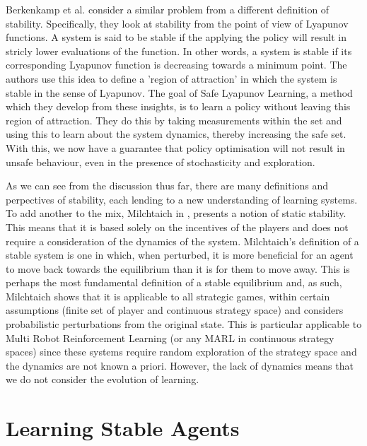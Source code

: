\documentclass[preprint,11pt]{report}
\begin{document}
Berkenkamp et al. \cite{Berkenkamp2017SafeGuarantees} consider a similar problem from a different
definition of stability. Specifically, they look at stability from the point of view of Lyapunov
functions. A system is said to be stable if the applying the policy will result in stricly lower
evaluations of the function. In other words, a system is stable if its corresponding Lyapunov
function is decreasing towards a minimum point. The authors use this idea to define a 'region of
attraction' in which the system is stable in the sense of Lyapunov. The goal of Safe Lyapunov
Learning, a method which they develop from these insights, is to learn a policy without leaving this
region of attraction. They do this by taking measurements within the set and using this to learn
about the system dynamics, thereby increasing the safe set. With this, we now have a guarantee that
policy optimisation will not result in unsafe behaviour, even in the presence of stochasticity and
exploration.

As we can see from the discussion thus far, there are many definitions and perpectives of stability,
each lending to a new understanding of learning systems. To add another to the mix, Milchtaich in
\cite{Milchtaich2007StaticGames}, presents a notion of static stability. This means that it is based
solely on the incentives of the players and does not require a consideration of the dynamics of the
system. Milchtaich's definition of a stable system is one in which, when perturbed, it is more
beneficial for an agent to move back towards the equilibrium than it is for them to move away. This
is perhaps the most fundamental definition of a stable equilibrium and, as such, Milchtaich shows
that it is applicable to all strategic games, within certain assumptions (finite set of player and
continuous strategy space) and considers probabilistic perturbations from the original state. This
is particular applicable to Multi Robot Reinforcement Learning (or any MARL in continuous strategy
spaces) since these systems require random exploration of the strategy space and the dynamics are
not known a priori. However, the lack of dynamics means that we do not consider the evolution of
learning. 

\section{Learning Stable Agents}
\end{document}
